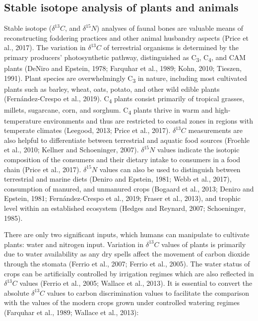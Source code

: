 \documentclass[5p]{elsarticle} %
\begin{document}
\hypertarget{stable-isotope-analysis-of-plants-and-animals}{%
\subsection{Stable isotope analysis of plants and animals}\label{stable-isotope-analysis-of-plants-and-animals}}

Stable isotope (\(\delta ^{13}C\), and \(\delta ^{15}N\)) analyses of faunal bones are valuable means of reconstructing foddering practices and other animal husbandry aspects (Price et al., 2017). The variation in \(\delta ^{13}C\) of terrestrial organisms is determined by the primary producers' photosynthetic pathway, distinguished as C\textsubscript{3}, C\textsubscript{4}, and CAM plants (DeNiro and Epstein, 1978; Farquhar et al., 1989; Kohn, 2010; Tieszen, 1991). Plant species are overwhelmingly C\textsubscript{3} in nature, including most cultivated plants such as barley, wheat, oats, potato, and other wild edible plants (Fernández-Crespo et al., 2019). C\textsubscript{4} plants consist primarily of tropical grasses, millets, sugarcane, corn, and sorghum. C\textsubscript{4} plants thrive in warm and high-temperature environments and thus are restricted to coastal zones in regions with temperate climates (Leegood, 2013; Price et al., 2017). \(\delta ^{13}C\) measurements are also helpful to differentiate between terrestrial and aquatic food sources (Froehle et al., 2010; Kellner and Schoeninger, 2007). \(\delta ^{15}N\) values indicate the isotopic composition of the consumers and their dietary intake to consumers in a food chain (Price et al., 2017). \(\delta ^{15}N\) values can also be used to distinguish between terrestrial and marine diets (Deniro and Epstein, 1981; Webb et al., 2017), consumption of manured, and unmanured crops (Bogaard et al., 2013; Deniro and Epstein, 1981; Fernández-Crespo et al., 2019; Fraser et al., 2013), and trophic level within an established ecosystem (Hedges and Reynard, 2007; Schoeninger, 1985).

There are only two significant inputs, which humans can manipulate to cultivate plants: water and nitrogen input. Variation in \(\delta ^{13}C\) values of plants is primarily due to water availability as any dry spells affect the movement of carbon dioxide through the stomata (Ferrio et al., 2007; Ferrio et al., 2005). The water status of crops can be artificially controlled by irrigation regimes which are also reflected in \(\delta ^{13}C\) values (Ferrio et al., 2005; Wallace et al., 2013). It is essential to convert the absolute \(\delta ^{13}C\) values to carbon discrimination values to facilitate the comparison with the values of the modern crops grown under controlled watering regimes (Farquhar et al., 1989; Wallace et al., 2013):
\end{document}
